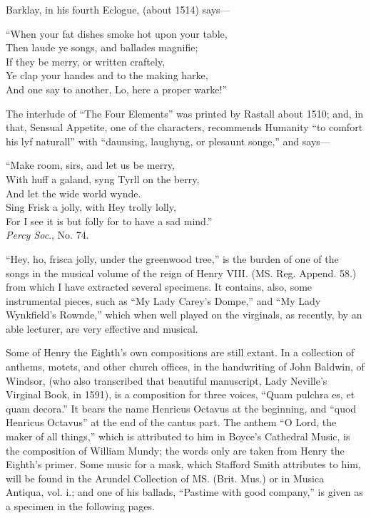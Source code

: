 Barklay, in his fourth Eclogue, (about 1514) says—
\begin{scverse}
“When your fat dishes smoke hot upon your table,\\
Then laude ye songs, and ballades magnifie;\\
If they be merry, or written craftely,\\
Ye clap your handes and to the making harke,\\
And one say to another, Lo, here a proper warke!”
\end{scverse}
The interlude of “The Four Elements” was printed by Rastall about 1510;
and, in that, Sensual Appetite, one of the characters, recommends Humanity “to
comfort his lyf naturall” with “daunsing, laughyng, or plesaunt songe,” and
says—
\begin{scverse}
“Make room, sirs, and let us be merry,\\
With huff a galand, syng Tyrll on the berry,\\
\vin And let the wide world wynde.\\
Sing Frisk a jolly, with Hey trolly lolly,\\
For I see it is but folly for to have a sad mind.”\\
\hfill \textit{Percy Soc}., No. 74.\hspace*{4em}
\end{scverse}
“Hey, ho, frisca jolly, under the greenwood tree,” is the burden of one of the
songs in the musical volume of the reign of Henry VIII. (MS. Reg. Append. 58.)
from which I have extracted several specimens. It contains, also, some instrumental
pieces, such as “My Lady Carey’s Dompe,” and “My Lady Wynkfield’s
Rownde,” which when well played on the virginals, as recently, by an able lecturer,
are very effective and musical.

Some of Henry the Eighth’s own compositions are still extant. In a collection
of anthems, motets, and other church offices, in the handwriting of John Baldwin,
of Windsor, (who also transcribed that beautiful manuscript, Lady Neville’s
Virginal Book, in 1591), is a composition for three voices, “Quam pulchra es, et
quam decora.” It bears the name Henricus Octavus at the beginning, and “quod
Henricus Octavus” at the end of the cantus part. The anthem “O Lord, the
maker of all things,” which is attributed to him in Boyce’s Cathedral Music, is
the composition of William Mundy; the words only are taken from Henry the
Eighth’s primer. Some music for a mask, which Stafford Smith attributes to
him, will be found in the Arundel Collection of MS. (Brit. Mus.) or in Musica
Antiqua, vol. i.; and one of his ballads, “Pastime with good company,” is given
as a specimen in the following pages.

